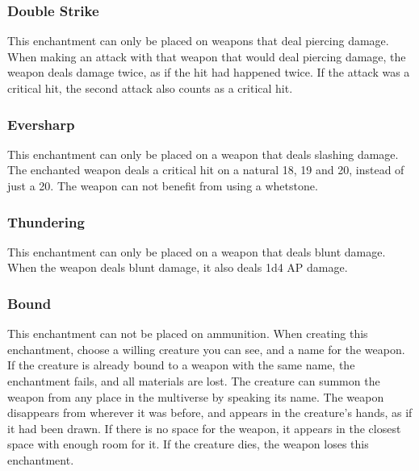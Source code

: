 \subsubsection{Double Strike}\label{enchantment:DoubleStrike}
This enchantment can only be placed on weapons that deal piercing damage.
When making an attack with that weapon that would deal piercing damage, the weapon deals damage twice, as if the hit had happened twice.
If the attack was a critical hit, the second attack also counts as a critical hit.

\subsubsection{Eversharp}\label{enchantment:Eversharp}
This enchantment can only be placed on a weapon that deals slashing damage.
The enchanted weapon deals a critical hit on a natural 18, 19 and 20, instead of just a 20.
The weapon can not benefit from using a whetstone.

\subsubsection{Thundering}\label{enchantment:Thundering}
This enchantment can only be placed on a weapon that deals blunt damage.
When the weapon deals blunt damage, it also deals 1d4 AP damage.

\subsubsection{Bound}\label{enchantment:Bound}
This enchantment can not be placed on ammunition.
When creating this enchantment, choose a willing creature you can see, and a name for the weapon.
If the creature is already bound to a weapon with the same name, the enchantment fails, and all materials are lost.
The creature can summon the weapon from any place in the multiverse by speaking its name.
The weapon disappears from wherever it was before, and appears in the creature's hands, as if it had been drawn.
If there is no space for the weapon, it appears in the closest space with enough room for it.
If the creature dies, the weapon loses this enchantment.
